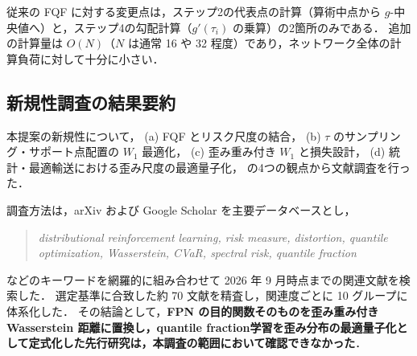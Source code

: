 \documentclass[a4paper,10pt]{jsarticle}
\theoremstyle{definition}
\newcommand{\Wone}{W_1}
\begin{document}
従来の FQF に対する変更点は，ステップ2の代表点の計算（算術中点から $g$-中央値へ）と，ステップ4の勾配計算（$g'(\tau_i)$ の乗算）の2箇所のみである．
追加の計算量は $O(N)$（$N$ は通常 16 や 32 程度）であり，ネットワーク全体の計算負荷に対して十分に小さい．

\subsection{新規性調査の結果要約}
\label{subsec:novelty}

本提案の新規性について，
(a) FQF とリスク尺度の結合，
(b) $\tau$ のサンプリング・サポート点配置の $\Wone$ 最適化，
(c) 歪み重み付き $\Wone$ と損失設計，
(d) 統計・最適輸送における歪み尺度の最適量子化，
の4つの観点から文献調査を行った．

調査方法は，arXiv および Google Scholar を主要データベースとし，
\begin{quote}
  \textit{distributional reinforcement learning, risk measure, distortion, quantile optimization, Wasserstein, CVaR, spectral risk, quantile fraction}
\end{quote}
などのキーワードを網羅的に組み合わせて 2026 年 9 月時点までの関連文献を検索した．
選定基準に合致した約 70 文献を精査し，関連度ごとに 10 グループに体系化した．
その結論として，\textbf{FPN の目的関数そのものを歪み重み付き Wasserstein 距離に置換し，quantile fraction学習を歪み分布の最適量子化として定式化した先行研究は，本調査の範囲において確認できなかった}．
\end{document}

